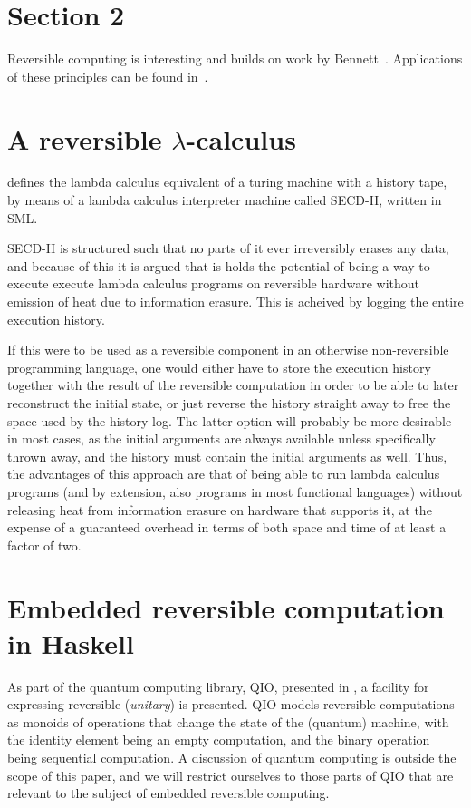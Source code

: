 \documentclass[10pt]{sigplanconf}
\begin{document}
\section{Section 2}
Reversible computing is interesting and builds on work by
Bennett~\cite{Bennett:1982}. Applications of these principles can be found
in~\cite{ThomsenAxelsen:2009:PPL,YokoyamaGlueck:2007:Janus}.


\section{A reversible $\lambda$-calculus}
\cite{huelsbergen1996logically} defines the lambda calculus equivalent of a
turing machine with a history tape, by means of a lambda calculus interpreter
machine called SECD-H, written in SML.

SECD-H is structured such that no parts of it ever irreversibly erases any
data, and because of this it is argued that is holds the potential of being a
way to execute execute lambda calculus programs on reversible hardware without
emission of heat due to information erasure.
This is acheived by logging the entire execution history.

If this were to be used as a reversible component in an otherwise
non-reversible programming language, one would either have to store the
execution history together with the result of the reversible computation in
order to be able to later reconstruct the initial state, or just reverse the
history straight away to free the space used by the history log. The latter
option will probably be more desirable in most cases, as the initial arguments
are always available unless specifically thrown away, and the history must
contain the initial arguments as well. Thus, the advantages of this approach
are that of being able to run lambda calculus programs (and by extension, also
programs in most functional languages) without releasing heat from information
erasure on hardware that supports it, at the expense of a guaranteed overhead
in terms of both space and time of at least a factor of two.

\section{Embedded reversible computation in Haskell}

As part of the quantum computing library, QIO, presented in
\cite{altenkirchquantum}, a facility for expressing reversible
(\textit{unitary}) is presented.  QIO models reversible computations
as monoids of operations that change the state of the (quantum)
machine, with the identity element being an empty computation, and the
binary operation being sequential computation.  A discussion of
quantum computing is outside the scope of this paper, and we will
restrict ourselves to those parts of QIO that are relevant to the
subject of embedded reversible computing.
\end{document}
